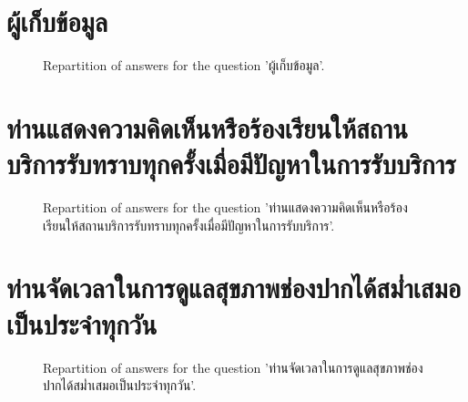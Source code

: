 \documentclass[12pt]{article}
\begin{document}
\clearpage{}
\section{ผู้เก็บข้อมูล}

\label{sec:249}


\begin{figure}[h!]
    \caption{\label{figure:q249-1}Repartition of answers for the question 'ผู้เก็บข้อมูล'.}
\end{figure}



\clearpage{}
\section{ท่านแสดงความคิดเห็นหรือร้องเรียนให้สถานบริการรับทราบทุกครั้งเมื่อมีปัญหาในการรับบริการ}

\label{sec:73}


\begin{figure}[h!]
    \caption{\label{figure:q73-1}Repartition of answers for the question 'ท่านแสดงความคิดเห็นหรือร้องเรียนให้สถานบริการรับทราบทุกครั้งเมื่อมีปัญหาในการรับบริการ'.}
\end{figure}



\clearpage{}
\section{ท่านจัดเวลาในการดูแลสุขภาพช่องปากได้สม่ำเสมอเป็นประจำทุกวัน}

\label{sec:74}


\begin{figure}[h!]
    \caption{\label{figure:q74-1}Repartition of answers for the question 'ท่านจัดเวลาในการดูแลสุขภาพช่องปากได้สม่ำเสมอเป็นประจำทุกวัน'.}
\end{figure}
\end{document}
